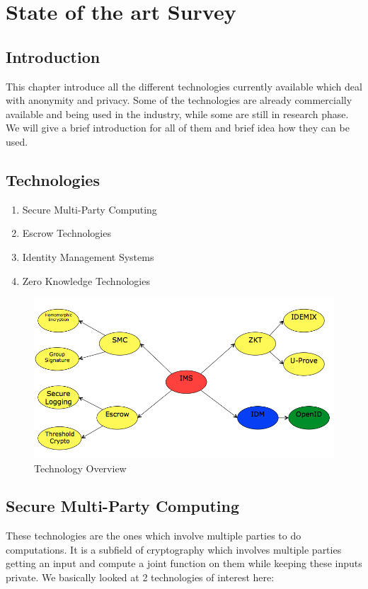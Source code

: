 \chapter{State of the art Survey}

\section{Introduction}
This chapter introduce all the different technologies currently available which deal with anonymity and privacy. Some of the technologies are already commercially available and being used in the industry, while some are still in research phase. We will give a brief introduction for all of them and brief idea how they can be used.


\section{Technologies}

\begin{enumerate}
	\item Secure Multi-Party Computing
	\item Escrow Technologies
	\item Identity Management Systems
	\item Zero Knowledge Technologies
\end{enumerate}
\begin{figure}[h]
	\centering
	\includegraphics[width=\textwidth]{figures/Technologies}
	\caption{Technology Overview}
	\label{fig:Technologies}
\end{figure}

\section{Secure Multi-Party Computing}
These technologies are the ones which involve multiple parties to do computations. It is a subfield of cryptography which involves multiple parties getting an input and compute a joint function on them while keeping these inputs private. We basically looked at 2 technologies of interest here:
